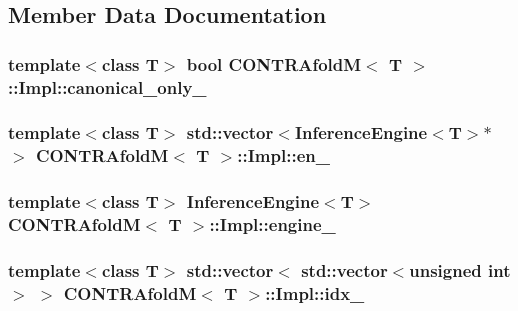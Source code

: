 \subsection{Member Data Documentation}
\hypertarget{struct_c_o_n_t_r_afold_m_1_1_impl_ab91edfe6d89438fdb6bf2edb6eeaa199}{
\subsubsection[{canonical\+\_\+only\+\_\+}]{\setlength{\rightskip}{0pt plus 5cm}template$<$class T$>$ bool {\bf C\+O\+N\+T\+R\+Afold\+M}$<$ T $>$\+::Impl\+::canonical\+\_\+only\+\_\+}}\label{struct_c_o_n_t_r_afold_m_1_1_impl_ab91edfe6d89438fdb6bf2edb6eeaa199}
\hypertarget{struct_c_o_n_t_r_afold_m_1_1_impl_a340457442751e450885b41148f2f8d04}{
\subsubsection[{en\+\_\+}]{\setlength{\rightskip}{0pt plus 5cm}template$<$class T$>$ std\+::vector$<${\bf Inference\+Engine}$<$T$>$$\ast$$>$ {\bf C\+O\+N\+T\+R\+Afold\+M}$<$ T $>$\+::Impl\+::en\+\_\+}}\label{struct_c_o_n_t_r_afold_m_1_1_impl_a340457442751e450885b41148f2f8d04}
\hypertarget{struct_c_o_n_t_r_afold_m_1_1_impl_acd8955919fbf8c8f9d86fc195a00cdb0}{
\subsubsection[{engine\+\_\+}]{\setlength{\rightskip}{0pt plus 5cm}template$<$class T$>$ {\bf Inference\+Engine}$<$T$>$ {\bf C\+O\+N\+T\+R\+Afold\+M}$<$ T $>$\+::Impl\+::engine\+\_\+}}\label{struct_c_o_n_t_r_afold_m_1_1_impl_acd8955919fbf8c8f9d86fc195a00cdb0}
\hypertarget{struct_c_o_n_t_r_afold_m_1_1_impl_ae0d86d3732f74d42ba6cc5993185aebb}{
\subsubsection[{idx\+\_\+}]{\setlength{\rightskip}{0pt plus 5cm}template$<$class T$>$ std\+::vector$<$ std\+::vector$<$unsigned int$>$ $>$ {\bf C\+O\+N\+T\+R\+Afold\+M}$<$ T $>$\+::Impl\+::idx\+\_\+}}\label{struct_c_o_n_t_r_afold_m_1_1_impl_ae0d86d3732f74d42ba6cc5993185aebb}
